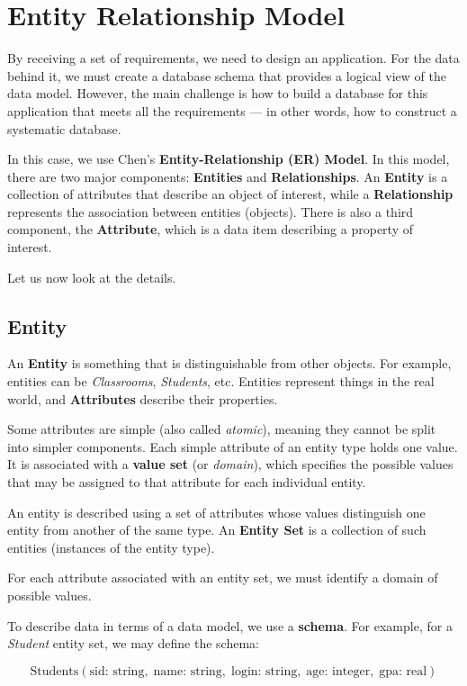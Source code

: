 \section{Entity Relationship Model}
By receiving a set of requirements, we need to design an application. For the data behind it, we must create a database schema that provides a logical view of the data model. However, the main challenge is how to build a database for this application that meets all the requirements — in other words, how to construct a systematic database.  

In this case, we use Chen's \textbf{Entity-Relationship (ER) Model}. In this model, there are two major components: \textbf{Entities} and \textbf{Relationships}. An \textbf{Entity} is a collection of attributes that describe an object of interest, while a \textbf{Relationship} represents the association between entities (objects). There is also a third component, the \textbf{Attribute}, which is a data item describing a property of interest.  

Let us now look at the details.

\subsection{Entity}
An \textbf{Entity} is something that is distinguishable from other objects. For example, entities can be \emph{Classrooms}, \emph{Students}, etc. Entities represent things in the real world, and \textbf{Attributes} describe their properties.  

Some attributes are simple (also called \emph{atomic}), meaning they cannot be split into simpler components. Each simple attribute of an entity type holds one value. It is associated with a \textbf{value set} (or \emph{domain}), which specifies the possible values that may be assigned to that attribute for each individual entity.  

An entity is described using a set of attributes whose values distinguish one entity from another of the same type. An \textbf{Entity Set} is a collection of such entities (instances of the entity type).  

For each attribute associated with an entity set, we must identify a domain of possible values.  

To describe data in terms of a data model, we use a \textbf{schema}. For example, for a \emph{Student} entity set, we may define the schema:  

\[
\text{Students}(\text{sid: string}, \; \text{name: string}, \; \text{login: string}, \; \text{age: integer}, \; \text{gpa: real})
\]  


